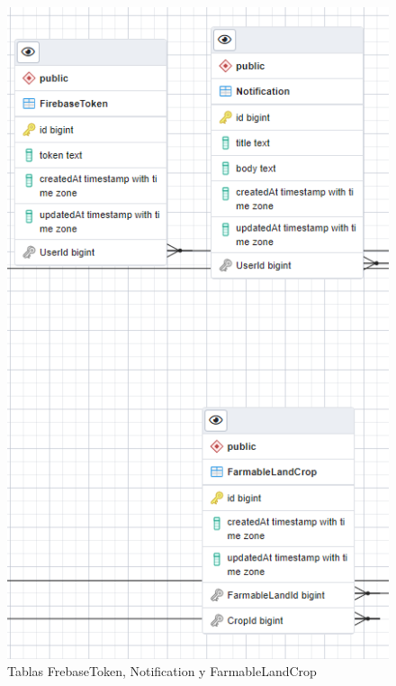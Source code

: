 \begin{figure}[H]
    \centering
    \includegraphics[width=1\linewidth]{images/design/erd2.png}
    \caption{Tablas FrebaseToken, Notification y FarmableLandCrop}
\end{figure}

